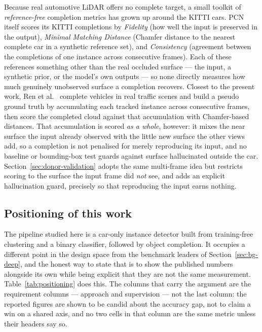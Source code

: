 Because real automotive LiDAR offers no complete target, a small toolkit of
\emph{reference-free} completion metrics has grown up around the KITTI cars.
PCN~\cite{yuan2019pcnpointcompletionnetwork} itself scores its KITTI completions by
\emph{Fidelity} (how well the input is preserved in the output), \emph{Minimal Matching
Distance} (Chamfer distance to the nearest complete car in a synthetic reference set), and
\emph{Consistency} (agreement between the completions of one instance across consecutive
frames). Each of these references something other than the real occluded surface --- the
input, a synthetic prior, or the model's own outputs --- so none directly measures how much
genuinely unobserved surface a completion recovers. Closest to the present work, Ren
et al.~\cite{ren2022selfsupervised} complete vehicles in real traffic scenes and build a
pseudo ground truth by accumulating each tracked instance across consecutive frames, then
score the completed cloud against that accumulation with Chamfer-based distances. That
accumulation is scored \emph{as a whole}, however: it mixes the near surface the input
already observed with the little new surface the other views add, so a completion is not
penalised for merely reproducing its input, and no baseline or bounding-box test guards
against surface hallucinated outside the car. Section~\ref{sec:donor-validation} adopts the
same multi-frame idea but restricts scoring to the surface the input frame did \emph{not}
see, and adds an explicit hallucination guard, precisely so that reproducing the input
earns nothing.

\subsection{Positioning of this work}
\label{sec:bg-positioning}

The pipeline studied here is a car-only instance detector built from training-free
clustering and a binary classifier, followed by object completion. It occupies a
different point in the design space from the benchmark leaders of
Section~\ref{sec:bg-deep}, and the honest way to state that is to show the published
numbers alongside its own while being explicit that they are not the same measurement.
Table~\ref{tab:positioning} does this. The columns that carry the argument are the
requirement columns --- approach and supervision --- not the last column: the reported
figures are shown to be candid about the accuracy gap, not to claim a win on a shared
axis, and no two cells in that column are the same metric unless their headers say so.

